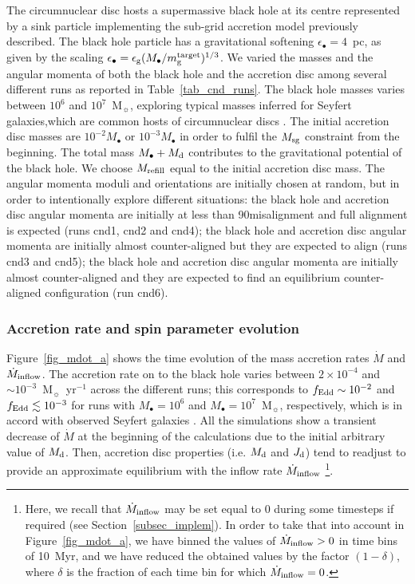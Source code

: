 \documentclass[a4paper,fleqn,usenatbib]{mnras}
\begin{document}
The circumnuclear disc hosts a supermassive black hole at its centre represented by a sink particle implementing the sub-grid accretion model previously described.
The black hole particle has a gravitational softening $\epsilon_{\bullet} = 4$~pc, as given by the scaling $\epsilon_{\bullet} = \epsilon_{\rm g} (M_{\bullet}/m_{\rm g}^{\rm target})^{1/3}$.
We varied the masses and the angular momenta of both the black hole and the accretion disc among several different runs as reported in Table~\ref{tab_cnd_runs}.
The black hole masses varies between $10^6$ and $10^7$~M$_{\sun}$, exploring typical masses inferred for Seyfert galaxies,which are common hosts of circumnuclear discs \citep{wandel+99,cracco+16,rakshit+17}.
The initial accretion disc masses are $10^{-2} M_{\bullet}$ or $10^{-3} M_{\bullet}$ in order to fulfil the $M_{\rm sg}$ constraint from the beginning.
The total mass $M_{\bullet} + M_{\rm d}$ contributes to the gravitational potential of the black hole.
We choose $M_{\rm refill}$ equal to the initial accretion disc mass.
The angular momenta moduli and orientations are initially chosen at random, but in order to intentionally explore different situations: the black hole and accretion disc angular momenta are initially at less than 90\degr misalignment and full alignment is expected (runs cnd1, cnd2 and cnd4); the black hole and accretion disc angular momenta are initially almost counter-aligned but they are expected to align (runs cnd3 and cnd5); the black hole and accretion disc angular momenta are initially almost counter-aligned and they are expected to find an equilibrium counter-aligned configuration (run cnd6).

\subsubsection{Accretion rate and spin parameter evolution}

Figure~\ref{fig_mdot_a} shows the time evolution of the mass accretion rates $\dot{M}$ and $\dot{M}_{\rm inflow}$.
The accretion rate on to the black hole varies between $2 \times 10^{-4}$ and $\sim 10^{-3}$~M$_{\sun}$~yr$^{-1}$ across the different runs; this corresponds to $f_{\rm Edd} \sim 10^{-2}$ and $f_{\rm Edd} \lesssim 10^{-3}$ for runs with $M_{\bullet} = 10^6$ and $M_{\bullet} = 10^7$~M$_{\sun}$, respectively, which is in accord with observed Seyfert galaxies \citep{onken+03,komossa+07,ho+09}.
All the simulations show a transient decrease of $\dot{M}$ at the beginning of the calculations due to the initial arbitrary value of $M_{\rm d}$.
Then, accretion disc properties (i.e. $M_{\rm d}$ and $J_{\rm d}$) tend to readjust to provide an approximate equilibrium with the inflow rate $\dot{M}_{\rm inflow}$ \footnote{Here, we recall that $\dot{M}_{\rm inflow}$ may be set equal to 0 during some timesteps if required (see Section~\ref{subsec_implem}).
In order to take that into account in Figure~\ref{fig_mdot_a}, we have binned  the values of $\dot{M}_{\rm inflow} > 0$ in time bins of 10~Myr, and we have reduced the obtained values by the factor $(1-\delta)$, where $\delta$ is the fraction of each time bin for which $\dot{M}_{\rm inflow} = 0$.}. 
\end{document}
